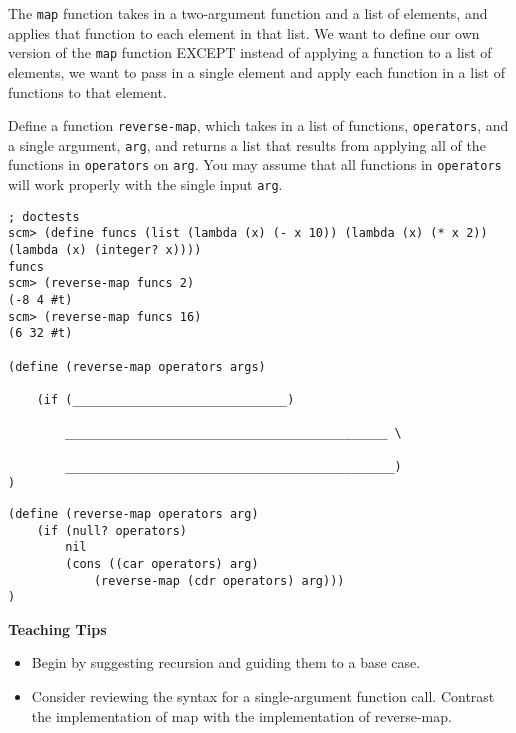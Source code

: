 \begin{blocksection}
\question
The \lstinline{map} function takes in a two-argument function and a list of elements, and applies that function to each element in that list. We want to define our own version of the \lstinline{map} function EXCEPT instead of applying a function to a list of elements, we want to pass in a single element and apply each function in a list of functions to that element.

Define a function \lstinline{reverse-map}, which takes in a list of functions, \lstinline{operators}, and a single argument, \lstinline{arg}, and returns a list that results from applying all of the functions in \lstinline{operators} on \lstinline{arg}. You may assume that all functions in \lstinline{operators} will work properly with the single input \lstinline{arg}.

\begin{lstlisting}
; doctests
scm> (define funcs (list (lambda (x) (- x 10)) (lambda (x) (* x 2)) (lambda (x) (integer? x))))
funcs
scm> (reverse-map funcs 2)
(-8 4 #t)
scm> (reverse-map funcs 16)
(6 32 #t)

(define (reverse-map operators args)

    (if (______________________________)

        _____________________________________________ \

        ______________________________________________)
)
\end{lstlisting}

\begin{solution}
\begin{lstlisting}
(define (reverse-map operators arg)
    (if (null? operators)
        nil
        (cons ((car operators) arg) 
            (reverse-map (cdr operators) arg)))
)
\end{lstlisting}
\end{solution}
\end{blocksection}

\begin{blocksection}
\begin{guide}
  \textbf{Teaching Tips}
  \begin{itemize}
      \item Begin by suggesting recursion and guiding them to a base case.
	\item Consider reviewing the syntax for a single-argument function call. Contrast the implementation of map with the implementation of reverse-map.
  \end{itemize}
\end{guide}
\end{blocksection}